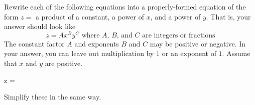 
Rewrite each of the following equations into a properly-formed equation of the form $z = $ a product of a constant, a power of $x$, and a power of $y$.
That is, your answer should look like
\begin{equation*}
 z = A x^B y^C \text{ where $A$, $B$, and $C$ are integers or fractions}
\end{equation*}
The constant factor $A$ and exponents $B$ and $C$ may be positive or negative.
In your answer, you can leave out multiplication by $1$ or an exponent of $1$.
Assume that $x$ and $y$ are positive.

\begin{multicols}{2}
 \begin{ProblemSet}[pencil space=2in]

  \begin{Problem}
   \Large
   \begin{LeftEquation}
    z = 
   \end{LeftEquation}
  \end{Problem}

 \end{ProblemSet}
\end{multicols}

\newpage
{}

Simplify these in the same way.

\begin{multicols}{2}
 \begin{ProblemSet}[pencil space=0in]
 \end{ProblemSet}
\end{multicols}

